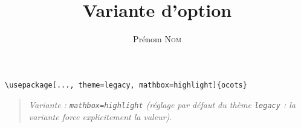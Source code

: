 \documentclass[11pt]{ocots-book}
\title{Variante d'option}
\author{Prénom \textsc{Nom}}
\newcommand{\ocotsvariantnote}[1]{\begin{quote}\itshape Variante : #1\end{quote}}
\begin{document}
\maketitle

\begin{lstlisting}
\usepackage[..., theme=legacy, mathbox=highlight]{ocots}
\end{lstlisting}
\ocotsvariantnote{\texttt{mathbox=highlight} (r\'eglage par d\'efaut du th\`eme \texttt{legacy} : la variante force explicitement la valeur).}

\end{document}
